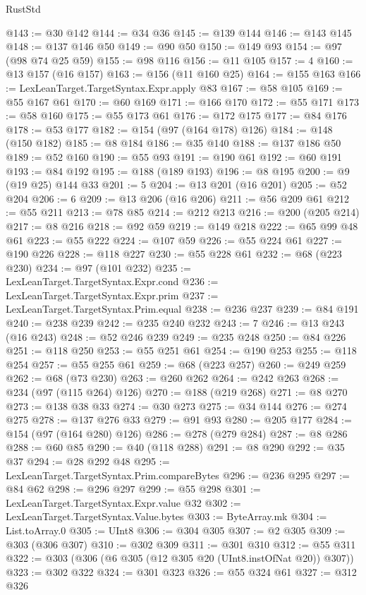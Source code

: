 \begin{lexlean}{RustStd}
\begin{coremodule}
@143 := @30 @142
@144 := @34 @36
@145 := @139 @144
@146 := @143 @145
@148 := @137 @146 @50
@149 := @90 @50
@150 := @149 @93
@154 := @97 (@98 @74 @25 @59)
@155 := @98 @116
@156 := @11 @105
@157 := 4
@160 := @13 @157 (@16 @157)
@163 := @156 (@11 @160 @25)
@164 := @155 @163
@166 := LexLeanTarget.TargetSyntax.Expr.apply @83
@167 := @58 @105
@169 := @55 @167 @61
@170 := @60 @169
@171 := @166 @170
@172 := @55 @171
@173 := @58 @160
@175 := @55 @173 @61
@176 := @172 @175
@177 := @84 @176
@178 := @53 @177
@182 := @154 (@97 (@164 @178) @126)
@184 := @148 (@150 @182)
@185 := @8 @184
@186 := @35 @140
@188 := @137 @186 @50
@189 := @52 @160
@190 := @55 @93
@191 := @190 @61
@192 := @60 @191
@193 := @84 @192
@195 := @188 (@189 @193)
@196 := @8 @195
@200 := @9 (@19 @25) @144 @33
@201 := 5
@204 := @13 @201 (@16 @201)
@205 := @52 @204
@206 := 6
@209 := @13 @206 (@16 @206)
@211 := @56 @209 @61
@212 := @55 @211
@213 := @78 @85
@214 := @212 @213
@216 := @200 (@205 @214)
@217 := @8 @216
@218 := @92 @59
@219 := @149 @218
@222 := @65 @99 @48 @61
@223 := @55 @222
@224 := @107 @59
@226 := @55 @224 @61
@227 := @190 @226
@228 := @118 @227
@230 := @55 @228 @61
@232 := @68 (@223 @230)
@234 := @97 (@101 @232)
@235 := LexLeanTarget.TargetSyntax.Expr.cond
@236 := LexLeanTarget.TargetSyntax.Expr.prim
@237 := LexLeanTarget.TargetSyntax.Prim.equal
@238 := @236 @237
@239 := @84 @191
@240 := @238 @239
@242 := @235 @240 @232
@243 := 7
@246 := @13 @243 (@16 @243)
@248 := @52 @246 @239
@249 := @235 @248
@250 := @84 @226
@251 := @118 @250
@253 := @55 @251 @61
@254 := @190 @253
@255 := @118 @254
@257 := @55 @255 @61
@259 := @68 (@223 @257)
@260 := @249 @259
@262 := @68 (@73 @230)
@263 := @260 @262
@264 := @242 @263
@268 := @234 (@97 (@115 @264) @126)
@270 := @188 (@219 @268)
@271 := @8 @270
@273 := @138 @38 @33
@274 := @30 @273
@275 := @34 @144
@276 := @274 @275
@278 := @137 @276 @33
@279 := @91 @93
@280 := @205 @177
@284 := @154 (@97 (@164 @280) @126)
@286 := @278 (@279 @284)
@287 := @8 @286
@288 := @60 @85
@290 := @40 (@118 @288)
@291 := @8 @290
@292 := @35 @37
@294 := @28 @292 @48
@295 := LexLeanTarget.TargetSyntax.Prim.compareBytes
@296 := @236 @295
@297 := @84 @62
@298 := @296 @297
@299 := @55 @298
@301 := LexLeanTarget.TargetSyntax.Expr.value @32
@302 := LexLeanTarget.TargetSyntax.Value.bytes
@303 := ByteArray.mk
@304 := List.toArray.{0}
@305 := UInt8
@306 := @304 @305
@307 := @2 @305
@309 := @303 (@306 @307)
@310 := @302 @309
@311 := @301 @310
@312 := @55 @311
@322 := @303 (@306 (@6 @305 (@12 @305 @20 (UInt8.instOfNat @20)) @307))
@323 := @302 @322
@324 := @301 @323
@326 := @55 @324 @61
@327 := @312 @326

\end{coremodule}
\end{lexlean}
